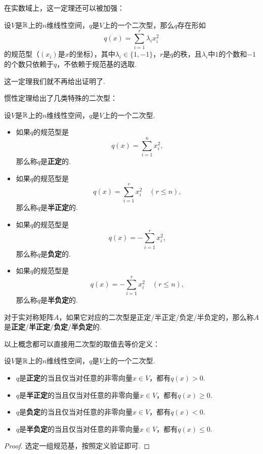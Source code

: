 在实数域上，这一定理还可以被加强：

\begin{theorem}[惯性定理]\label{thm:inertia-theorem}
    设$V$是$\mathbb{R}$上的$n$维线性空间，$q$是$V$上的一个二次型，那么$q$存在形如
    \[
        q(x)=\sum_{i=1}^r \lambda_i x_i^2
    \]
    的规范型（$(x_i)$是$x$的坐标），其中$\lambda_i\in\{1,-1\}$，$r$是$q$的秩，且$\lambda_i$中$1$的个数和$-1$的个数只依赖于$q$，不依赖于规范基的选取. 
\end{theorem}

这一定理我们就不再给出证明了. 

惯性定理给出了几类特殊的二次型：

\begin{definition}\label{def:positive-definite}
    设$V$是$\mathbb{R}$上的$n$维线性空间，$q$是$V$上的一个二次型. 
    \begin{itemize}
        \item 如果$q$的规范型是
        \[
            q(x)=\sum_{i=1}^n x_i^2,
        \]
        那么称$q$是\textbf{正定}的. 
        \item 如果$q$的规范型是
        \[
            q(x)=\sum_{i=1}^r x_i^2\quad(r\leq n),
        \]
        那么称$q$是\textbf{半正定}的. 
        \item 如果$q$的规范型是
        \[
            q(x)=-\sum_{i=1}^r x_i^2,
        \]
        那么称$q$是\textbf{负定}的. 
        \item 如果$q$的规范型是
        \[
            q(x)=-\sum_{i=1}^r x_i^2\quad(r\leq n),
        \]
        那么称$q$是\textbf{半负定}的. 
    \end{itemize}

对于实对称矩阵$A$，如果它对应的二次型是正定/半正定/负定/半负定的，那么称$A$是\textbf{正定}/\textbf{半正定}/\textbf{负定}/\textbf{半负定}的. 
\end{definition}

以上概念都可以直接用二次型的取值去等价定义：
\begin{proposition}\label{prop:positive-definite}
    设$V$是$\mathbb{R}$上的$n$维线性空间，$q$是$V$上的一个二次型. 
    \begin{itemize}
        \item $q$是\textbf{正定}的当且仅当对任意的非零向量$x\in V$，都有$q(x)>0$. 
        \item $q$是\textbf{半正定}的当且仅当对任意的非零向量$x\in V$，都有$q(x)\geq 0$. 
        \item $q$是\textbf{负定}的当且仅当对任意的非零向量$x\in V$，都有$q(x)<0$. 
        \item $q$是\textbf{半负定}的当且仅当对任意的非零向量$x\in V$，都有$q(x)\leq 0$. 
    \end{itemize}
\end{proposition}
\begin{proof}
    选定一组规范基，按照定义验证即可. 
\end{proof}

